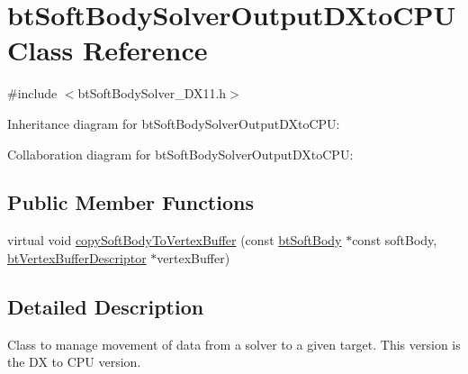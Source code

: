\hypertarget{classbt_soft_body_solver_output_d_xto_c_p_u}{\section{bt\+Soft\+Body\+Solver\+Output\+D\+Xto\+C\+P\+U Class Reference}
\label{classbt_soft_body_solver_output_d_xto_c_p_u}
}


{\ttfamily \#include $<$bt\+Soft\+Body\+Solver\+\_\+\+D\+X11.\+h$>$}



Inheritance diagram for bt\+Soft\+Body\+Solver\+Output\+D\+Xto\+C\+P\+U\+:


Collaboration diagram for bt\+Soft\+Body\+Solver\+Output\+D\+Xto\+C\+P\+U\+:
\subsection*{Public Member Functions}
\begin{DoxyCompactItemize}
\item 
virtual void \hyperlink{classbt_soft_body_solver_output_d_xto_c_p_u_a0106bf90eec43326254607cab4a10478}{copy\+Soft\+Body\+To\+Vertex\+Buffer} (const \hyperlink{classbt_soft_body}{bt\+Soft\+Body} $\ast$const soft\+Body, \hyperlink{classbt_vertex_buffer_descriptor}{bt\+Vertex\+Buffer\+Descriptor} $\ast$vertex\+Buffer)
\end{DoxyCompactItemize}


\subsection{Detailed Description}
Class to manage movement of data from a solver to a given target. This version is the D\+X to C\+P\+U version. 

